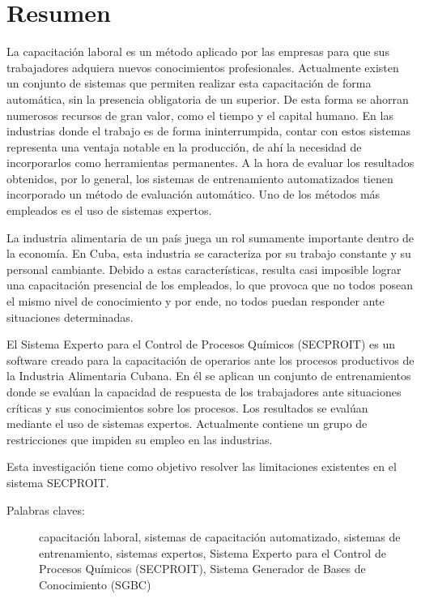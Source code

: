 \section*{Resumen}
La capacitación laboral es un método aplicado por las empresas para que sus trabajadores adquiera nuevos conocimientos profesionales. Actualmente existen un conjunto de sistemas que permiten realizar esta capacitación de forma automática, sin la presencia obligatoria de un superior. De esta forma se ahorran numerosos recursos de gran valor, como el tiempo y el capital humano.
En las industrias donde el trabajo es de forma ininterrumpida, contar con estos sistemas representa una ventaja notable en la producción, de ahí la necesidad de incorporarlos como herramientas permanentes.
A la hora de evaluar los resultados obtenidos, por lo general, los sistemas de entrenamiento automatizados tienen incorporado un método de evaluación automático. Uno de los métodos más empleados es el uso de sistemas expertos.

La industria alimentaria de un país juega un rol sumamente importante dentro de la economía. En Cuba, esta industria se caracteriza por su trabajo constante y su personal cambiante. Debido a estas características, resulta casi imposible lograr una capacitación presencial de los empleados, lo que provoca que no todos posean el mismo nivel de conocimiento y por ende, no todos puedan responder ante situaciones determinadas.

El Sistema Experto para el Control de Procesos Químicos (SECPROIT) es un software creado para la capacitación de operarios ante los procesos productivos de la Industria Alimentaria Cubana. En él se aplican un conjunto de entrenamientos donde se evalúan la capacidad de respuesta de los trabajadores ante situaciones críticas y sus conocimientos sobre los procesos. Los resultados se evalúan mediante el uso de sistemas expertos. Actualmente contiene un grupo de restricciones que impiden su empleo en las industrias.

Esta investigación tiene como objetivo resolver las limitaciones existentes en el sistema SECPROIT.

\vfill

\begin{description}
	\item[Palabras claves:]{capacitación laboral, sistemas de capacitación automatizado, sistemas de entrenamiento, sistemas expertos, Sistema Experto para el Control de Procesos Químicos (SECPROIT), Sistema Generador de Bases de Conocimiento (SGBC)}
\end{description}


